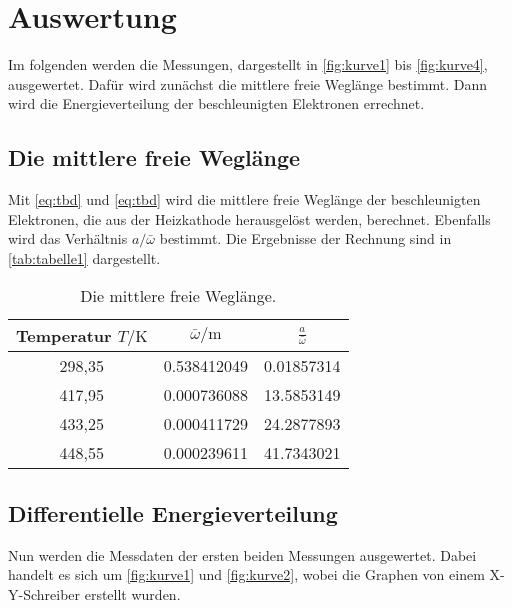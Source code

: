 \section{Auswertung}
\label{sec:Auswertung}

Im folgenden werden die Messungen, dargestellt in \autoref{fig:kurve1} bis \autoref{fig:kurve4}, ausgewertet.
Dafür wird zunächst die mittlere freie Weglänge bestimmt.
Dann wird die Energieverteilung der beschleunigten Elektronen errechnet.


\subsection{Die mittlere freie Weglänge}
Mit \autoref{eq:tbd} und \autoref{eq:tbd} wird die mittlere freie Weglänge der beschleunigten Elektronen,
die aus der Heizkathode herausgelöst werden, berechnet.
Ebenfalls wird das Verhältnis $a / \bar{\omega}$ bestimmt.
Die Ergebnisse der Rechnung sind in \autoref{tab:tabelle1} dargestellt.

\begin{table} [H]
  \centering
  \caption{Die mittlere freie Weglänge.}
  \label{tab:tabelle1}
  \begin{tabular}{c c c}
      \toprule
      Temperatur $T / \unit\kelvin$ & $\bar{\omega} / \unit\meter$ & $\frac{a}{\bar{\omega}}$ \\
      \midrule 
      298,35 & 0.538412049 & 0.01857314\\
      417,95 & 0.000736088 & 13.5853149\\
      433,25 & 0.000411729 & 24.2877893\\
      448,55 & 0.000239611 & 41.7343021\\
      \bottomrule
  \end{tabular}
\end{table}

\subsection{Differentielle Energieverteilung}
Nun werden die Messdaten der ersten beiden Messungen ausgewertet.
Dabei handelt es sich um \autoref{fig:kurve1} und \autoref{fig:kurve2}, wobei die Graphen von einem X-Y-Schreiber erstellt wurden.
